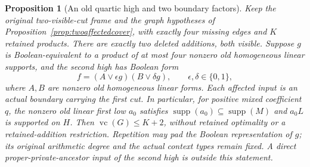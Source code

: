 \documentclass[11pt]{article}
\newcommand{\supp}{\operatorname{supp}}
\newcommand{\vc}{\operatorname{vc}}
\newtheorem{proposition}[theorem]{Proposition}
\theoremstyle{definition}
\theoremstyle{remark}
\begin{document}
\begin{proposition}[An old quartic high and two boundary factors]\label{prop:quartictwoboundary}
Keep the original two-visible-cut frame and the graph hypotheses of Proposition~\ref{prop:twoaffectedcover}, with exactly four missing edges and $K$ retained products. There are exactly two deleted additions, both visible. Suppose $g$ is Boolean-equivalent to a product of at most four nonzero old homogeneous linear supports, and the second high has Boolean form
\[
f=(A\vee\epsilon g)(B\vee\delta g),\qquad
\epsilon,\delta\in\{0,1\},
\]
where $A,B$ are nonzero old homogeneous linear forms. Each affected input is an actual boundary carrying the first cut. In particular, for positive mixed coefficient $q$, the nonzero old linear first low $a_0$ satisfies $\supp(a_0)\subseteq\supp(M)$ and $a_0L$ is supported on $H$. Then $\vc(G)\le K+2$, without retained optimality or a retained-addition restriction. Repetition may pad the Boolean representation of $g$; its original arithmetic degree and the actual context types remain fixed. A direct proper-private-ancestor input of the second high is outside this statement.
\end{proposition}
\end{document}
